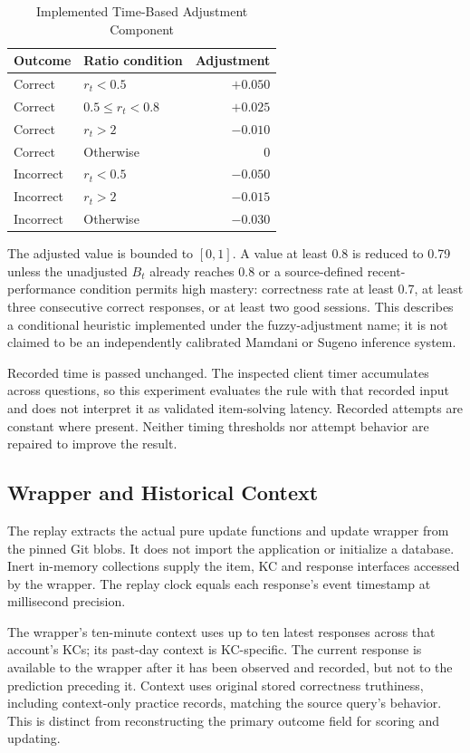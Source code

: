 \documentclass[conference]{IEEEtran}
\begin{document}
\begin{table}[t]
\caption{Implemented Time-Based Adjustment Component}
\label{tab:rules}
\centering
\begin{tabular}{llr}
\hline
Outcome & Ratio condition & Adjustment \\
\hline
Correct & $r_t<0.5$ & $+0.050$ \\
Correct & $0.5\leq r_t<0.8$ & $+0.025$ \\
Correct & $r_t>2$ & $-0.010$ \\
Correct & Otherwise & $0$ \\
Incorrect & $r_t<0.5$ & $-0.050$ \\
Incorrect & $r_t>2$ & $-0.015$ \\
Incorrect & Otherwise & $-0.030$ \\
\hline
\end{tabular}
\end{table}

The adjusted value is bounded to $[0,1]$. A value at least 0.8 is reduced to 0.79 unless the unadjusted $B_t$ already reaches 0.8 or a source-defined recent-performance condition permits high mastery: correctness rate at least 0.7, at least three consecutive correct responses, or at least two good sessions. This describes a conditional heuristic implemented under the fuzzy-adjustment name; it is not claimed to be an independently calibrated Mamdani or Sugeno inference system.

Recorded time is passed unchanged. The inspected client timer accumulates across questions, so this experiment evaluates the rule with that recorded input and does not interpret it as validated item-solving latency. Recorded attempts are constant where present. Neither timing thresholds nor attempt behavior are repaired to improve the result.

\subsection{Wrapper and Historical Context}
The replay extracts the actual pure update functions and update wrapper from the pinned Git blobs. It does not import the application or initialize a database. Inert in-memory collections supply the item, KC and response interfaces accessed by the wrapper. The replay clock equals each response's event timestamp at millisecond precision.

The wrapper's ten-minute context uses up to ten latest responses across that account's KCs; its past-day context is KC-specific. The current response is available to the wrapper after it has been observed and recorded, but not to the prediction preceding it. Context uses original stored correctness truthiness, including context-only practice records, matching the source query's behavior. This is distinct from reconstructing the primary outcome field for scoring and updating.
\end{document}
